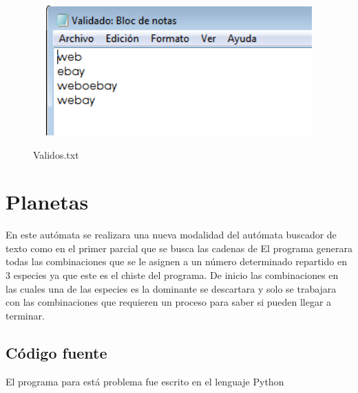 \documentclass[12pt]{article}
\begin{document}
\begin{figure}[H]
\includegraphics[width=15cm, height=5cm]{web_validos}
\label{fig:manual_afn}
\caption{Validos.txt}
\end{figure}

\newpage
\section{Planetas}
En este autómata se realizara una nueva modalidad del autómata buscador de texto como en el primer parcial que se busca las cadenas de El programa generara todas las combinaciones que se le asignen a un número determinado repartido en 3 especies ya que este es el chiste del programa. De inicio las combinaciones en las cuales una de las especies es la dominante se descartara y solo se trabajara con las combinaciones que requieren un proceso para saber si pueden llegar a terminar.
\subsection{Código fuente}
El programa para está problema fue escrito en el lenguaje Python\\
\end{document}

